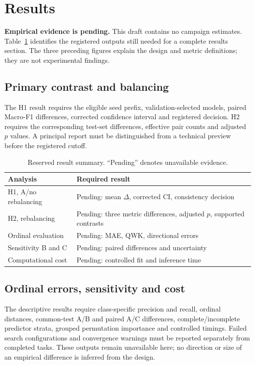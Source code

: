 \section{Results}
\textbf{Empirical evidence is pending.} This draft contains no campaign
estimates. Table~\ref{tab:results} identifies the registered outputs still
needed for a complete results section. The three preceding figures explain
the design and metric definitions; they are not experimental findings.

\subsection{Primary contrast and balancing}
The H1 result requires the eligible seed prefix, validation-selected models,
paired Macro-F1 differences, corrected confidence interval and registered
decision. H2 requires the corresponding test-set differences, effective pair
counts and adjusted $p$ values. A principal report must be distinguished
from a technical preview before the registered cutoff.

\begin{table}[t]
\caption{Reserved result summary. ``Pending'' denotes unavailable evidence.}
\label{tab:results}
\begin{tabular}{@{}p{}p{}@{}}
\toprule
Analysis & Required result \\
\midrule
H1, A/no rebalancing & Pending: mean $\Delta$, corrected CI, consistency decision \\
H2, rebalancing & Pending: three metric differences, adjusted $p$, supported contrasts \\
Ordinal evaluation & Pending: MAE, QWK, directional errors \\
Sensitivity B and C & Pending: paired differences and uncertainty \\
Computational cost & Pending: controlled fit and inference time \\
\bottomrule
\end{tabular}
\end{table}


\subsection{Ordinal errors, sensitivity and cost}
The descriptive results require class-specific precision and recall, ordinal
distances, common-test A/B and paired A/C differences, complete/incomplete
predictor strata, grouped permutation importance and controlled timings.
Failed search configurations and convergence warnings must be reported
separately from completed tasks. These outputs remain unavailable here;
no direction or size of an empirical difference is inferred from the design.

